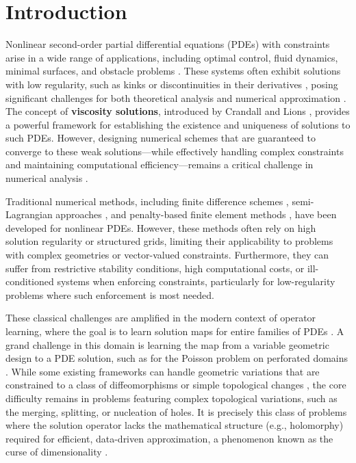 \documentclass[pdflatex,sn-mathphys-num]{sn-jnl}%
\theoremstyle{thmstyleone}%
\numberwithin{equation}{section}
\begin{document}
\section{Introduction}

Nonlinear second-order partial differential equations (PDEs) with constraints arise in a wide range of applications, including optimal control, fluid dynamics, minimal surfaces, and obstacle problems \cite{feng2013recent,casas2020critical,abels2013incompressible,finn1954equations,caffarelli1987lipschitz}. These systems often exhibit solutions with low regularity, such as kinks or discontinuities in their derivatives \cite{grisvard2011elliptic,jerison1981dirichlet}, posing significant challenges for both theoretical analysis and numerical approximation \cite{rousset2021general,cao2022new}. The concept of \textbf{viscosity solutions}, introduced by Crandall and Lions \cite{crandall1984some,crandall1983viscosity}, provides a powerful framework for establishing the existence and uniqueness of solutions to such PDEs. However, designing numerical schemes that are guaranteed to converge to these weak solutions—while effectively handling complex constraints and maintaining computational efficiency—remains a critical challenge in numerical analysis \cite{capuzzo1990hamilton,achdou2020mean,lions1993shape,hahn2024laplacian}.

Traditional numerical methods, including finite difference schemes \cite{barles1991convergence}, semi-Lagrangian approaches \cite{falcone2013semi}, and penalty-based finite element methods \cite{babuvska1973nonconforming}, have been developed for nonlinear PDEs. However, these methods often rely on high solution regularity or structured grids, limiting their applicability to problems with complex geometries or vector-valued constraints. Furthermore, they can suffer from restrictive stability conditions, high computational costs, or ill-conditioned systems when enforcing constraints, particularly for low-regularity problems where such enforcement is most needed.

These classical challenges are amplified in the modern context of operator learning, where the goal is to learn solution maps for entire families of PDEs \cite{kovachki2023neural, kovachki2024operator}. A grand challenge in this domain is learning the map from a variable geometric design to a PDE solution, such as for the Poisson problem on perforated domains \cite{han2024stochastic}. While some existing frameworks can handle geometric variations that are constrained to a class of diffeomorphisms or simple topological changes \cite{aylwin2020domain, serrano2023operator}, the core difficulty remains in problems featuring complex topological variations, such as the merging, splitting, or nucleation of holes. It is precisely this class of problems where the solution operator lacks the mathematical structure (e.g., holomorphy) required for efficient, data-driven approximation, a phenomenon known as the curse of dimensionality \cite{lanthaler2022error, cohen2010convergence, marcati2023exponential}.
\end{document}
